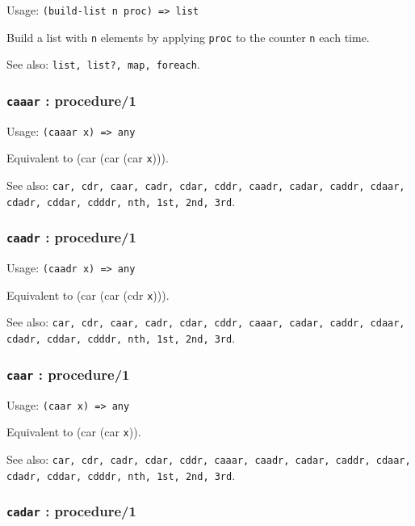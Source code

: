 \documentclass[
]{article}
\newcommand{\passthrough}[1]{#1}
\begin{document}
Usage: \passthrough{\lstinline!(build-list n proc) => list!}

Build a list with \passthrough{\lstinline!n!} elements by applying
\passthrough{\lstinline!proc!} to the counter
\passthrough{\lstinline!n!} each time.

See also: \passthrough{\lstinline!list, list?, map, foreach!}.

\hypertarget{caaar-procedure1}{%
\subsubsection{\texorpdfstring{\texttt{caaar} :
procedure/1}{caaar : procedure/1}}\label{caaar-procedure1}}

Usage: \passthrough{\lstinline!(caaar x) => any!}

Equivalent to (car (car (car \passthrough{\lstinline!x!}))).

See also:
\passthrough{\lstinline!car, cdr, caar, cadr, cdar, cddr, caadr, cadar, caddr, cdaar, cdadr, cddar, cdddr, nth, 1st, 2nd, 3rd!}.

\hypertarget{caadr-procedure1}{%
\subsubsection{\texorpdfstring{\texttt{caadr} :
procedure/1}{caadr : procedure/1}}\label{caadr-procedure1}}

Usage: \passthrough{\lstinline!(caadr x) => any!}

Equivalent to (car (car (cdr \passthrough{\lstinline!x!}))).

See also:
\passthrough{\lstinline!car, cdr, caar, cadr, cdar, cddr, caaar, cadar, caddr, cdaar, cdadr, cddar, cdddr, nth, 1st, 2nd, 3rd!}.

\hypertarget{caar-procedure1}{%
\subsubsection{\texorpdfstring{\texttt{caar} :
procedure/1}{caar : procedure/1}}\label{caar-procedure1}}

Usage: \passthrough{\lstinline!(caar x) => any!}

Equivalent to (car (car \passthrough{\lstinline!x!})).

See also:
\passthrough{\lstinline!car, cdr, cadr, cdar, cddr, caaar, caadr, cadar, caddr, cdaar, cdadr, cddar, cdddr, nth, 1st, 2nd, 3rd!}.

\hypertarget{cadar-procedure1}{%
\subsubsection{\texorpdfstring{\texttt{cadar} :
procedure/1}{cadar : procedure/1}}\label{cadar-procedure1}}
\end{document}
